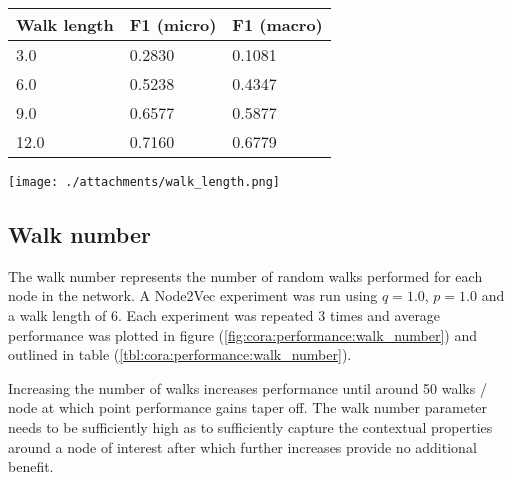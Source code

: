 \documentclass[a4paper,10pt]{article}
\begin{document}
  \begin{minipage}[c][17em]{0.49\textwidth}
    \begin{tabular}{m{4em} m{7em} m{7em}}

      \hline
      Walk length & F1 (micro)  & F1 (macro) \\
      \hline\hline

      3.0	& 0.2830	& 0.1081 \\
      \hline
      6.0	& 0.5238	& 0.4347 \\
      \hline
      9.0	& 0.6577	& 0.5877 \\
      \hline
      12.0	& 0.7160	& 0.6779 \\
      \hline

    \end{tabular}

    \label{tbl:cora:performance:walk_length}


  \end{minipage}
\hfill
  \begin{minipage}[c][17em]{0.49\textwidth}

    \texttt{[image: ./attachments/walk\_length.png]}
      \label{fig:cora:performance:walk_length}



  \end{minipage}


\subsection{Walk number}

The walk number represents the number of random walks performed for each node in the network. A Node2Vec experiment was run using $q = 1.0$, $p = 1.0$ and a walk length of $6$. Each experiment was repeated 3 times and average performance was plotted in figure (\ref{fig:cora:performance:walk_number}) and outlined in table (\ref{tbl:cora:performance:walk_number}).

 Increasing the number of walks increases performance until around 50 walks / node at which point performance gains taper off. The walk number parameter needs to be sufficiently high as to sufficiently capture the contextual properties around a node of interest after which further increases provide no additional benefit.
\end{document}
